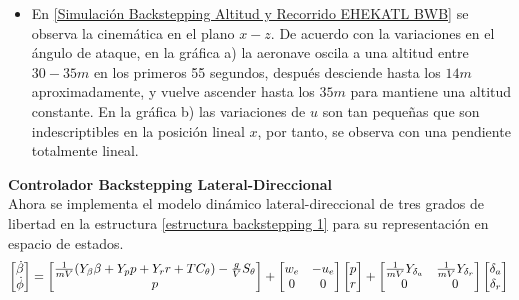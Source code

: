 \begin{itemize}
    Los elevadores tienen un sentido positivo en dirección de las manecillas, es decir, cuando en respuesta la nariz de la aeronave va hacia arriba. Por deducción, cuando los elevador tienen un valor negativo el momento hace que la aeronave vaya nariz abajo.
    \item En \ref{Simulación Backstepping Altitud y Recorrido EHEKATL BWB} se observa la cinemática en el plano $x-z$. 
    De acuerdo con la variaciones en el ángulo de ataque, en la gráfica a) la aeronave oscila a una altitud entre $30-35m$ en los primeros 55 segundos, después desciende hasta los $14m$ aproximadamente, y vuelve ascender hasta los $35m$ para mantiene una altitud constante. 
    En la gráfica b) las variaciones de $u$ son tan pequeñas que son indescriptibles en la posición lineal $x$, por tanto, se observa con una pendiente totalmente lineal. 
\end{itemize}

\medskip

\textbf{Controlador Backstepping Lateral-Direccional}\\
Ahora se implementa el modelo dinámico lateral-direccional de tres grados de libertad en la estructura \ref{estructura backstepping 1} para su representación en espacio de estados.
\begin{equation}
    \begin{bmatrix}
        \dot \beta \\
        \dot \phi
    \end{bmatrix}
    =
    \begin{bmatrix}
        \frac{1}{mV} (Y_\beta \beta + Y_p p + Y_r r + T C_\theta) - \frac{g}{V} S_\theta \\
        p
    \end{bmatrix}
    +
    \begin{bmatrix}
    w_e & - u_e \\
    0 & 0
    \end{bmatrix}
    \begin{bmatrix}
      p  \\
      r
    \end{bmatrix}
    +
    \begin{bmatrix}
     \frac{1}{mV} Y_{\delta_a} & \frac{1}{mV} Y_{\delta_r} \\
      0 & 0 \\
    \end{bmatrix}
    \begin{bmatrix}
        \delta_{a} \\
        \delta_{r} \\
    \end{bmatrix} \nonumber\\
\end{equation}

